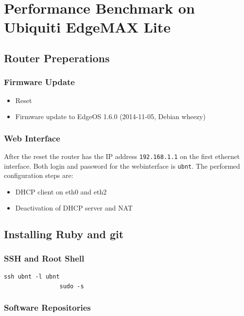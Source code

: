 \section{Performance Benchmark on Ubiquiti EdgeMAX Lite}
\label{cha:rawdata:ubiquiti}

	\subsection{Router Preperations}

		\subsubsection{Firmware Update}

			\begin{itemize}
				\item Reset
				\item Firmware update to EdgeOS 1.6.0 (2014-11-05, Debian wheezy)
			\end{itemize}

		\subsubsection{Web Interface}

			After the reset the router has the IP address \texttt{192.168.1.1}
			on the first ethernet interface. Both login and password for the
			webinterface is \texttt{ubnt}. The performed configuration steps
			are:

			\begin{itemize}
				\item DHCP client on eth0 and eth2
				\item Deactivation of DHCP server and NAT
			\end{itemize}

	\subsection{Installing Ruby and git}

		\subsubsection{SSH and Root Shell}

			\begin{lstlisting}[gobble=8]
				ssh ubnt -l ubnt
				sudo -s
			\end{lstlisting}

		\subsubsection{Software Repositories}

